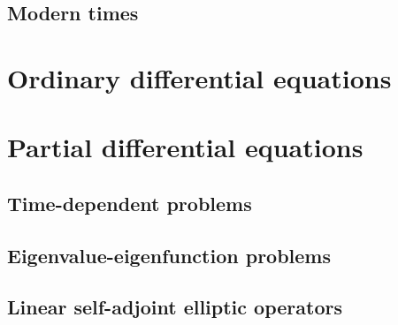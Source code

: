 \subsection{Modern times}

\section{Ordinary differential equations}


\section{Partial differential equations}

\subsection{Time-dependent problems}

\subsection{Eigenvalue-eigenfunction problems}

\subsection{Linear self-adjoint elliptic operators}\label{sec:c1_selfadjoint}



\begin{theorem}
\end{theorem}

\begin{theorem}
\end{theorem}

\begin{theorem}
\end{theorem}

\stopchapter
